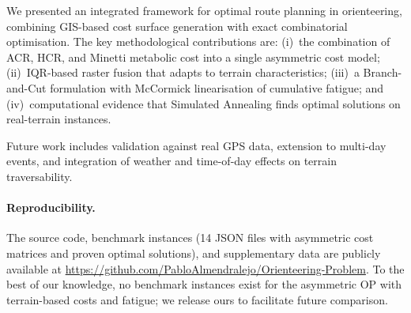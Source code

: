 \documentclass[11pt,a4paper]{article}
\begin{document}
We presented an integrated framework for optimal route planning in orienteering, combining GIS-based cost surface generation with exact combinatorial optimisation.
The key methodological contributions are: (i)~the combination of ACR, HCR, and Minetti metabolic cost into a single asymmetric cost model; (ii)~IQR-based raster fusion that adapts to terrain characteristics; (iii)~a Branch-and-Cut formulation with McCormick linearisation of cumulative fatigue; and (iv)~computational evidence that Simulated Annealing finds optimal solutions on real-terrain instances.

Future work includes validation against real GPS data, extension to multi-day events, and integration of weather and time-of-day effects on terrain traversability.

\paragraph{Reproducibility.}
The source code, benchmark instances (14 JSON files with asymmetric cost matrices and proven optimal solutions), and supplementary data are publicly available at \url{https://github.com/PabloAlmendralejo/Orienteering-Problem}.
To the best of our knowledge, no benchmark instances exist for the asymmetric OP with terrain-based costs and fatigue; we release ours to facilitate future comparison.



\end{document}
